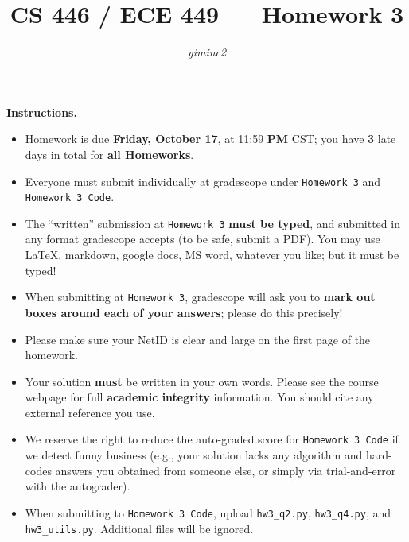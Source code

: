 \documentclass{article}
\title{CS 446 / ECE 449 --- Homework 3}
\author{\emph{yiminc2}}
\date{}
\theoremstyle{definition}
\theoremstyle{remark}
\begin{document}
\maketitle

\noindent\textbf{Instructions.}
\begin{itemize}
	\item
	      Homework is due \textbf{Friday, October 17}, at 11:59 \textbf{PM} CST; you have \textbf{3} late days in total for \textbf{all Homeworks}.

	\item
	      Everyone must submit individually at gradescope under \texttt{Homework 3} and \texttt{Homework 3 Code}.

	\item
	      The ``written'' submission at \texttt{Homework 3} \textbf{must be typed}, and submitted in
	      any format gradescope accepts (to be safe, submit a PDF).  You may use \LaTeX, markdown,
	      google docs, MS word, whatever you like; but it must be typed!

	\item
	      When submitting at \texttt{Homework 3}, gradescope will ask you to \textbf{mark out boxes
		      around each of your answers}; please do this precisely!

	\item
	      Please make sure your NetID is clear and large on the first page of the homework.

	\item
	      Your solution \textbf{must} be written in your own words.
	      Please see the course webpage for full \textbf{academic integrity} information.
	      You should cite any external reference you use.

	\item
	      We reserve the right to reduce the auto-graded score for
	      \texttt{Homework 3 Code} if we detect funny business (e.g., your solution
	      lacks any algorithm and hard-codes answers you obtained from
	      someone else, or simply via trial-and-error with the autograder).

	\item
	      When submitting to \texttt{Homework 3 Code}, upload \texttt{hw3\_q2.py}, \texttt{hw3\_q4.py}, and \texttt{hw3\_utils.py}. Additional files will be ignored.

\end{itemize}
\end{document}

